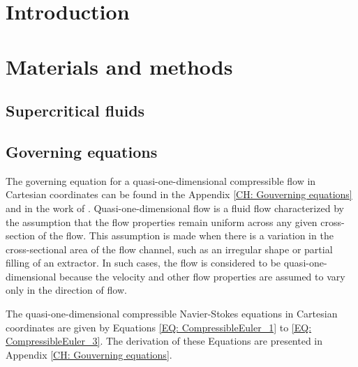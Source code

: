 \documentclass[a4paper,fleqn]{cas-dc}
\begin{document}
\maketitle


\section{Introduction}


\section{Materials and methods} \label{CH: Materials and methods}

\subsection{Supercritical fluids} \label{CH: Thermodynamic}


\subsection{Governing equations} \label{CH:Governing_equations_chapter}
	The governing equation for a quasi-one-dimensional compressible flow in Cartesian coordinates can be found in the Appendix \ref{CH: Gouverning equations} and in the work of \citet{Anderson1995}. Quasi-one-dimensional flow is a fluid flow characterized by the assumption that the flow properties remain uniform across any given cross-section of the flow. This assumption is made when there is a variation in the cross-sectional area of the flow channel, such as an irregular shape or partial filling of an extractor. In such cases, the flow is considered to be quasi-one-dimensional because the velocity and other flow properties are assumed to vary only in the direction of flow.

The quasi-one-dimensional compressible Navier-Stokes equations in Cartesian coordinates are given by Equations \ref{EQ: CompressibleEuler_1} to \ref{EQ: CompressibleEuler_3}. The derivation of these Equations are presented in Appendix \ref{CH: Gouverning equations}.
\end{document}
